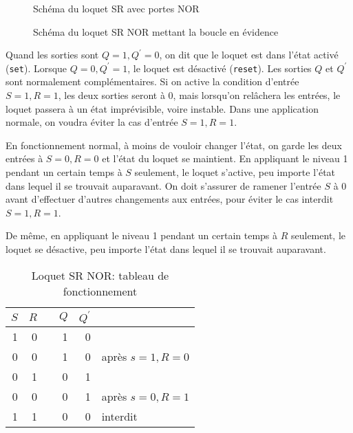 \documentclass[11pt]{article}
\begin{document}
\begin{figure}[htbp]
\centering

\caption{\label{fig:org161375e}Schéma du loquet SR avec portes NOR}
\end{figure}


\begin{figure}[htbp]
\centering

\caption{\label{fig:org963d0e5}Schéma du loquet SR NOR mettant la boucle en évidence}
\end{figure}

Quand les sorties sont \(Q=1, Q^\prime=0\), on dit que le loquet est
dans l'état activé (\texttt{set}). Lorsque \(Q=0, Q^\prime=1\), le loquet
est désactivé (\texttt{reset}). Les sorties \(Q\) et \(Q^\prime\) sont
normalement complémentaires. Si on active la condition d'entrée \(S=1,
R=1\), les deux sorties seront à 0, mais lorsqu'on relâchera les
entrées, le loquet passera à un état imprévisible, voire
instable. Dans une application normale, on voudra éviter la cas
d'entrée \(S=1, R=1\). 

En fonctionnement normal, à moins de vouloir changer l'état, on garde
les deux entrées à \(S=0, R=0\) et l'état du loquet se maintient. En
appliquant le niveau 1 pendant un certain temps à \(S\) seulement, le
loquet s'active, peu importe l'état dans lequel il se trouvait
auparavant. On doit s'assurer de ramener l'entrée \(S\) à 0 avant
d'effectuer d'autres changements aux entrées, pour éviter le cas
interdit \(S=1, R=1\).

De même, en appliquant le niveau 1 pendant un certain
temps à \(R\) seulement, le loquet se désactive, peu importe l'état
dans lequel il se trouvait auparavant.

\begin{table}[htbp]
\caption{\label{tab:orgc9a17be}Loquet SR NOR: tableau de fonctionnement}
\centering
\begin{tabular}{rrlrrl}
\(S\) & \(R\) &  & \(Q\) & \(Q^\prime\) & \\
\hline
1 & 0 &  & 1 & 0 & \\
0 & 0 &  & 1 & 0 & après \(s=1, R=0\)\\
0 & 1 &  & 0 & 1 & \\
0 & 0 &  & 0 & 1 & après \(s=0, R=1\)\\
1 & 1 &  & 0 & 0 & interdit\\
\end{tabular}
\end{table}
\end{document}
